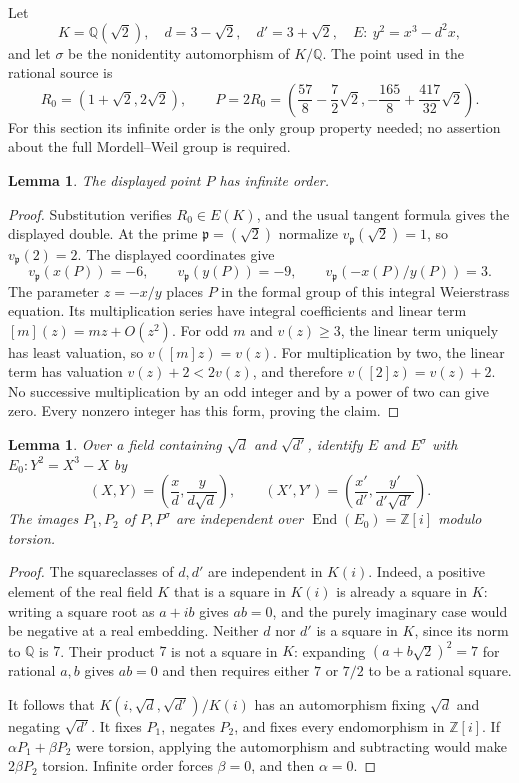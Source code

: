 \documentclass[11pt,a4paper]{article}
\newtheorem{lemma}[theorem]{Lemma}
\newcommand{\Q}{\mathbb Q}\newcommand{\Z}{\mathbb Z}
\DeclareMathOperator{\End}{End}
\begin{document}
Let
\[
 K=\Q(\sqrt2),\quad d=3-\sqrt2,\quad d'=3+\sqrt2,
 \quad E:\ y^2=x^3-d^2x,
\]
and let $\sigma$ be the nonidentity automorphism of $K/\Q$.
The point used in the rational source is
\[
 R_0=(1+\sqrt2,2\sqrt2),\qquad
 P=2R_0=\left(\frac{57}{8}-\frac72\sqrt2,
             -\frac{165}{8}+\frac{417}{32}\sqrt2\right).
\]
For this section its infinite order is the only group
property needed; no assertion about the full Mordell--Weil
group is required.

\begin{lemma}
The displayed point $P$ has infinite order.
\end{lemma}
\begin{proof}
Substitution verifies $R_0\in E(K)$, and the usual tangent
formula gives the displayed double. At the prime
$\mathfrak p=(\sqrt2)$ normalize $v_{\mathfrak p}(\sqrt2)=1$,
so $v_{\mathfrak p}(2)=2$. The displayed coordinates give
\[
 v_{\mathfrak p}(x(P))=-6,\qquad
 v_{\mathfrak p}(y(P))=-9,\qquad
 v_{\mathfrak p}(-x(P)/y(P))=3.
\]
The parameter $z=-x/y$ places $P$ in the formal group of
this integral Weierstrass equation. Its multiplication series
have integral coefficients and linear term $[m](z)=mz+O(z^2)$.
For odd $m$ and $v(z)\ge3$, the linear term uniquely has
least valuation, so $v([m]z)=v(z)$. For multiplication by
two, the linear term has valuation $v(z)+2<2v(z)$,
and therefore $v([2]z)=v(z)+2$. No successive multiplication
by an odd integer and by a power of two can give zero.
Every nonzero integer has this form, proving the claim.
\end{proof}

\begin{lemma}\label{lem:independent}
Over a field containing $\sqrt d$ and $\sqrt{d'}$, identify
$E$ and $E^\sigma$ with $E_0:Y^2=X^3-X$ by
\[
 (X,Y)=\left(\frac{x}{d},\frac{y}{d\sqrt d}\right),
 \qquad
 (X',Y')=\left(\frac{x'}{d'},\frac{y'}{d'\sqrt{d'}}\right).
\]
The images $P_1,P_2$ of $P,P^\sigma$ are independent over
$\End(E_0)=\Z[i]$ modulo torsion.
\end{lemma}
\begin{proof}
The squareclasses of $d,d'$ are independent in $K(i)$.
Indeed, a positive element of the real field $K$ that is a
square in $K(i)$ is already a square in $K$: writing a square
root as $a+ib$ gives $ab=0$, and the purely imaginary case
would be negative at a real embedding. Neither $d$ nor $d'$
is a square in $K$, since its norm to $\Q$ is $7$. Their
product $7$ is not a square in $K$: expanding
$(a+b\sqrt2)^2=7$ for rational $a,b$ gives $ab=0$ and then
requires either $7$ or $7/2$ to be a rational square.

It follows that $K(i,\sqrt d,\sqrt{d'})/K(i)$ has an
automorphism fixing $\sqrt d$ and negating $\sqrt{d'}$.
It fixes $P_1$, negates $P_2$, and fixes every endomorphism
in $\Z[i]$. If $\alpha P_1+\beta P_2$ were torsion, applying
the automorphism and subtracting would make $2\beta P_2$
torsion. Infinite order forces $\beta=0$, and then
$\alpha=0$.
\end{proof}
\end{document}
